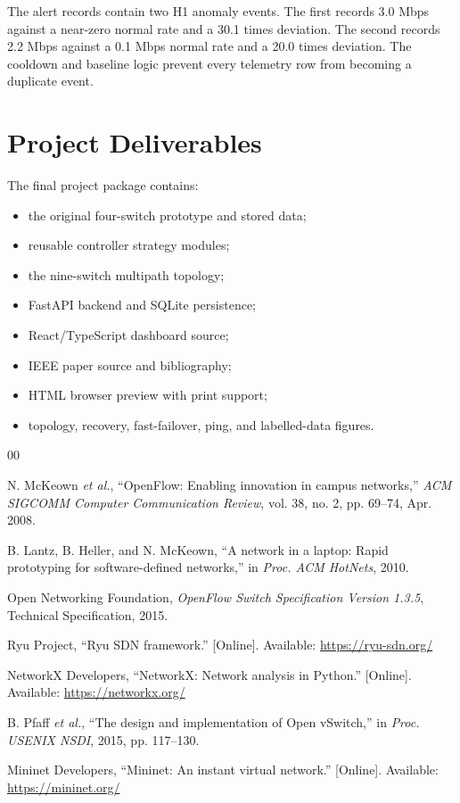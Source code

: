 \documentclass[conference]{IEEEtran}
\begin{document}
The alert records contain two H1 anomaly events. The first records 3.0 Mbps
against a near-zero normal rate and a 30.1 times deviation. The second records
2.2 Mbps against a 0.1 Mbps normal rate and a 20.0 times deviation. The
cooldown and baseline logic prevent every telemetry row from becoming a
duplicate event.

\section{Project Deliverables}
\label{app:deliverables}

The final project package contains:
\begin{itemize}
\item the original four-switch prototype and stored data;
\item reusable controller strategy modules;
\item the nine-switch multipath topology;
\item FastAPI backend and SQLite persistence;
\item React/TypeScript dashboard source;
\item IEEE paper source and bibliography;
\item HTML browser preview with print support;
\item topology, recovery, fast-failover, ping, and labelled-data figures.
\end{itemize}

\begin{thebibliography}{00}

N. McKeown \emph{et al.}, ``OpenFlow: Enabling innovation in campus networks,''
\emph{ACM SIGCOMM Computer Communication Review}, vol. 38, no. 2,
pp. 69--74, Apr. 2008.

B. Lantz, B. Heller, and N. McKeown, ``A network in a laptop: Rapid prototyping
for software-defined networks,'' in \emph{Proc. ACM HotNets}, 2010.

Open Networking Foundation, \emph{OpenFlow Switch Specification Version 1.3.5},
Technical Specification, 2015.

Ryu Project, ``Ryu SDN framework.'' [Online]. Available:
\url{https://ryu-sdn.org/}

NetworkX Developers, ``NetworkX: Network analysis in Python.'' [Online].
Available: \url{https://networkx.org/}

B. Pfaff \emph{et al.}, ``The design and implementation of Open vSwitch,''
in \emph{Proc. USENIX NSDI}, 2015, pp. 117--130.

Mininet Developers, ``Mininet: An instant virtual network.'' [Online].
Available: \url{https://mininet.org/}

\end{thebibliography}
\end{document}
